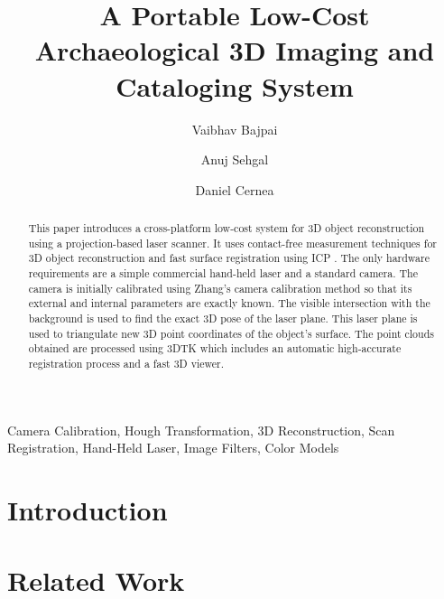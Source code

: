 \documentclass[english]{llncs}
\newenvironment{keywords}{
       \list{}{\advance\topsep by0.35cm\relax\small
       \leftmargin=1cm
       \labelwidth=0.35cm
       \listparindent=0.35cm
       \itemindent\listparindent
       \rightmargin\leftmargin}
			 \item[\hskip\labelsep\bfseries Keywords:]}
     {\endlist}
\begin{document}
\frontmatter 
	\pagestyle{headings} 
\mainmatter 

\title{A Portable Low-Cost Archaeological 3D Imaging and Cataloging System}

\author{Vaibhav Bajpai\and Anuj Sehgal\and Daniel Cernea}



\maketitle

\begin{abstract}
This paper introduces a cross-platform low-cost system for 3D object reconstruction using a projection-based laser scanner. It uses contact-free measurement techniques for 3D object reconstruction and fast surface registration using \ac{ICP} \cite{besl:1992}. The only hardware requirements are a simple commercial hand-held laser and a standard camera. The camera is initially calibrated using Zhang's camera calibration method so that its external and internal parameters are exactly known. The visible intersection with the background is used to find the exact 3D pose of the laser plane. This laser plane is used to triangulate new 3D point coordinates of the object's surface. The point clouds obtained are processed using \ac{3DTK} \cite{3dtk:2012} which includes an automatic high-accurate registration process and a fast 3D viewer.
\end{abstract}

\begin{keywords}
	Camera Calibration, Hough Transformation, 
	3D Reconstruction, Scan Registration, 
	Hand-Held Laser, Image Filters, Color Models
\end{keywords}

\section{Introduction}
\label{section:introduction}


\section{Related Work}
\label{section:relatedwork}

\end{document}
